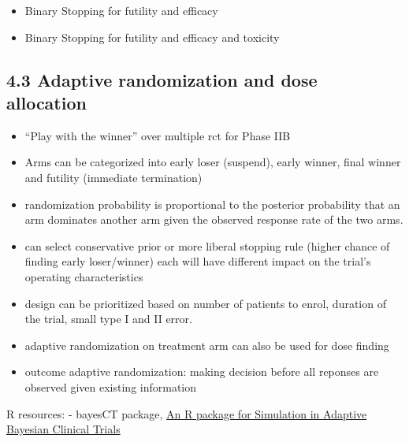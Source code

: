 \documentclass[
]{article}
\providecommand{\tightlist}{%
  \setlength{\itemsep}{0pt}\setlength{\parskip}{0pt}}
\begin{document}
\begin{itemize}
\tightlist
\item
  Binary Stopping for futility and efficacy
\item
  Binary Stopping for futility and efficacy and toxicity
\end{itemize}

\hypertarget{adaptive-randomization-and-dose-allocation}{%
\subsection{4.3 Adaptive randomization and dose
allocation}\label{adaptive-randomization-and-dose-allocation}}

\begin{itemize}
\item
  ``Play with the winner'' over multiple rct for Phase IIB
\item
  Arms can be categorized into early loser (suspend), early winner,
  final winner and futility (immediate termination)
\item
  randomization probability is proportional to the posterior probability
  that an arm dominates another arm given the observed response rate of
  the two arms.
\item
  can select conservative prior or more liberal stopping rule (higher
  chance of finding early loser/winner) each will have different impact
  on the trial's operating characteristics
\item
  design can be prioritized based on number of patients to enrol,
  duration of the trial, small type I and II error.
\item
  adaptive randomization on treatment arm can also be used for dose
  finding
\item
  outcome adaptive randomization: making decision before all reponses
  are observed given existing information
\end{itemize}

R resources: - bayesCT package,
\href{https://cran.r-project.org/web/packages/bayesCT/vignettes/bayesCT.html}{An
R package for Simulation in Adaptive Bayesian Clinical Trials}
\end{document}

